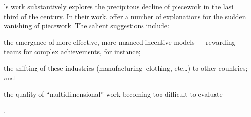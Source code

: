 \documentclass[trackingWork]{subfiles}
\begin{document}
\citeauthor{hart2013rise}'s work substantively explores the precipitous decline of piecework in the last third of the  century.
In their work, \citeauthor{hart2013rise} offer a number of explanations for the sudden vanishing of piecework.
The salient suggestions include:
\begin{inlinelist}
\item the emergence of more effective, more nuanced incentive models
--- rewarding teams for complex achievements, for instance;
\item the shifting of these industries (manufacturing, clothing, etc\dots)
to other countries; and
\item the quality of ``multidimensional'' work becoming too difficult to evaluate
\end{inlinelist}
\cite{hart2013rise}.

\onlyinsubfile{
  \printbibliography
  }
\end{document}
